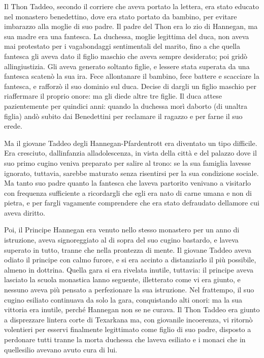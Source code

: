 Il Thon Taddeo, secondo il corriere che aveva portato la lettera, era
stato educato nel monastero benedettino, dove era stato portato da
bambino, per evitare imbarazzo alla moglie di suo padre. Il padre del
Thon era lo zio di Hannegan, ma sua madre era una fantesca. La duchessa,
moglie legittima del duca, non aveva mai protestato per i vagabondaggi
sentimentali del marito, fino a che quella fantesca gli aveva dato il
figlio maschio che aveva sempre desiderato; poi gridò
all\textquotesingle ingiustizia. Gli aveva generato soltanto figlie, e
l\textquotesingle essere stata superata da una fantesca scatenò la sua
ira. Fece allontanare il bambino, fece battere e scacciare la fantesca,
e rafforzò il suo dominio sul duca. Decise di dargli un figlio maschio
per riaffermare il proprio onore: ma gli diede altre tre figlie. Il duca
attese pazientemente per quindici anni: quando la duchessa morì
d\textquotesingle aborto (di un\textquotesingle altra figlia) andò
subito dai Benedettini per reclamare il ragazzo e per farne il suo
erede.

Ma il giovane Taddeo degli Hannegan-Pfardentrott era diventato un tipo
difficile. Era cresciuto, dall\textquotesingle infanzia
all\textquotesingle adolescenza, in vista della città e del palazzo dove
il suo primo cugino veniva preparato per salire al trono: se la sua
famiglia l\textquotesingle avesse ignorato, tuttavia, sarebbe maturato
senza risentirsi per la sua condizione sociale. Ma tanto suo padre
quanto la fantesca che l\textquotesingle aveva partorito venivano a
visitarlo con frequenza sufficiente a ricordargli che egli era nato di
carne umana e non di pietra, e per fargli vagamente comprendere che era
stato defraudato dell\textquotesingle amore cui aveva diritto.

Poi, il Principe Hannegan era venuto nello stesso monastero per un anno
di istruzione, aveva signoreggiato al di sopra del suo cugino bastardo,
e l\textquotesingle aveva superato in tutto, tranne che nella prontezza
di mente. Il giovane Taddeo aveva odiato il principe con calmo furore, e
si era accinto a distanziarlo il più possibile, almeno in dottrina.
Quella gara si era rivelata inutile, tuttavia: il principe aveva
lasciato la scuola monastica l\textquotesingle anno seguente,
illetterato come vi era giunto, e nessuno aveva più pensato a
perfezionare la sua istruzione. Nel frattempo, il suo cugino esiliato
continuava da solo la gara, conquistando alti onori: ma la sua vittoria
era inutile, perché Hannegan non se ne curava. Il Thon Taddeo era giunto
a disprezzare l\textquotesingle intera corte di Texarkana ma, con
giovanile incoerenza, vi ritornò volentieri per esservi finalmente
legittimato come figlio di suo padre, disposto a perdonare tutti tranne
la morta duchessa che l\textquotesingle aveva esiliato e i monaci che in
quell\textquotesingle esilio avevano avuto cura di lui.

